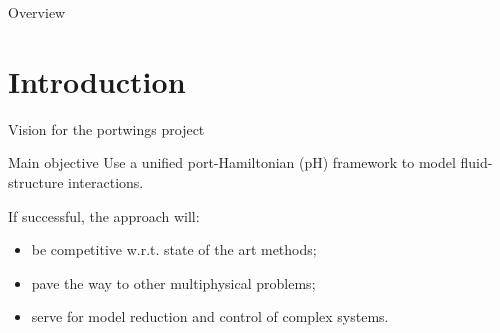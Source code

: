 \documentclass[aspectratio=169]{beamer}
\begin{document}
\begin{frame}[plain]


    
\end{frame}

\begin{frame}{Overview}
	\tableofcontents
\end{frame}

\section{Introduction}

\begin{frame}{Vision for the portwings project}

\begin{block}{Main objective}
Use a unified port-Hamiltonian (pH) framework to model fluid-structure interactions.
\end{block}

If successful, the approach will: 
\begin{itemize}
	\item be competitive w.r.t. state of the art methods;
	\item pave the way to other multiphysical problems;
	\item serve for model reduction and control of complex systems.
\end{itemize}


\end{frame}
\end{document}
